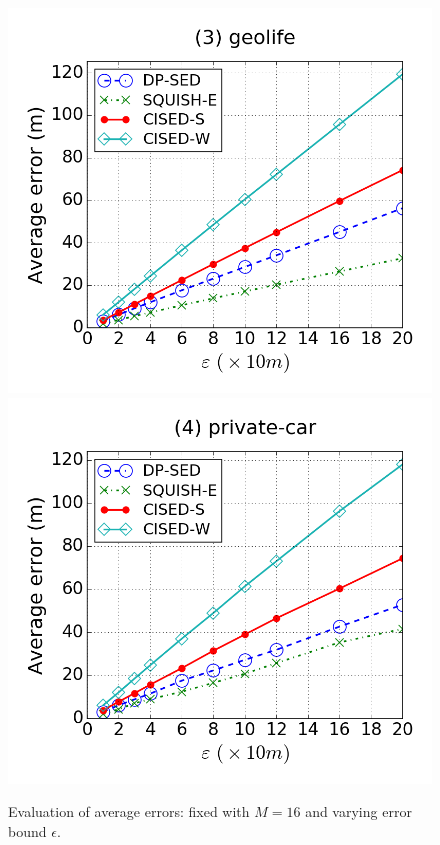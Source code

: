 \begin{figure}[tb]
\includegraphics[scale = 0.250]{figures/Exp-error-epsilon-geolife.png}
\includegraphics[scale = 0.250]{figures/Exp-error-epsilon-private.png}
\vspace{-2ex}
\caption{\small Evaluation of average errors: fixed with $M=16$ and varying error bound $\epsilon$.}
\label{fig:ae-m16}
\vspace{-2ex}
\end{figure}



